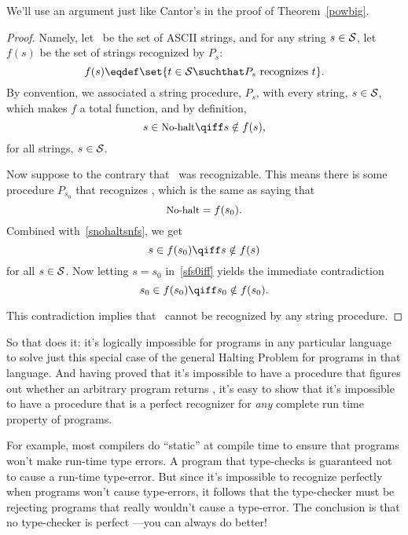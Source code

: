 We'll use an argument just like Cantor's in the proof of
Theorem~\ref{powbig}.

\begin{proof}
Namely, let \asciistr\ be the set of ASCII strings, and for any string
$s \in \text{$\mathcal{S}$}$, let
$f(s)$ be the set of strings recognized by $P_s$:
\[
f(s) \eqdef \set{t \in \asciistr \suchthat P_s \text{ recognizes } t}.
\]
By convention, we associated a string procedure, $P_s$, with every
string, $s \in \text{$\mathcal{S}$}$, which makes $f$ a total function, and by
definition,
\begin{equation}\label{snohaltsnfs}
s \in \nohalt \qiff s \notin f(s),
\end{equation}
for all strings, $s \in \text{$\mathcal{S}$}$.

Now suppose to the contrary that \nohalt\ was recognizable.  This
means there is some procedure $P_{s_0}$ that recognizes \nohalt, which
is the same as saying that
\[
\text{\small{No-halt}} = f(s_0).
\]
Combined with~\eqref{snohaltsnfs}, we get
\begin{equation}\label{sfs0iff}
s \in f(s_0) \qiff s \notin f(s)
\end{equation}
for all $s \in \text{$\mathcal{S}$}$.  Now letting $s = s_0$ in~\eqref{sfs0iff}
yields the immediate contradiction
\[
s_0 \in f(s_0) \qiff s_0 \notin f(s_0).
\]

This contradiction implies that \nohalt\ cannot be recognized by any
string procedure.
\end{proof}

So that does it: it's logically impossible for programs in any
particular language to solve just this special case of the general
Halting Problem for programs in that language.  And having proved that
it's impossible to have a procedure that figures out whether an
arbitrary program returns \True, it's easy to show that
it's impossible to have a procedure that is a perfect recognizer for
\emph{any} complete run time property of programs.

For example, most compilers do ``static''  at compile
time to ensure that programs won't make run-time type errors.  A program
that type-checks is guaranteed not to cause a run-time type-error.  But
since it's impossible to recognize perfectly when programs won't cause
type-errors, it follows that the type-checker must be rejecting programs
that really wouldn't cause a type-error.  The conclusion is that no
type-checker is perfect ---you can always do better!

